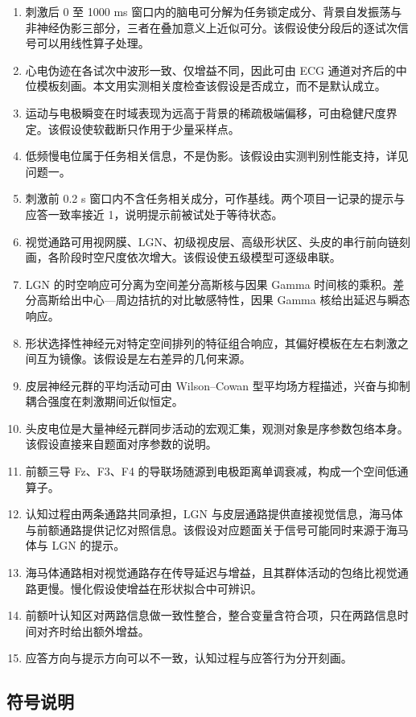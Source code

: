 \documentclass[bwprint]{gmcmthesis}
\begin{document}
\begin{enumerate}
\item 刺激后 0 至 1000 ms 窗口内的脑电可分解为任务锁定成分、背景自发振荡与非神经伪影三部分，三者在叠加意义上近似可分。该假设使分段后的逐试次信号可以用线性算子处理。
\item 心电伪迹在各试次中波形一致、仅增益不同，因此可由 ECG 通道对齐后的中位模板刻画。本文用实测相关度检查该假设是否成立，而不是默认成立。
\item 运动与电极瞬变在时域表现为远高于背景的稀疏极端偏移，可由稳健尺度界定。该假设使软截断只作用于少量采样点。
\item 低频慢电位属于任务相关信息，不是伪影。该假设由实测判别性能支持，详见问题一。
\item 刺激前 0.2 s 窗口内不含任务相关成分，可作基线。两个项目一记录的提示与应答一致率接近 1，说明提示前被试处于等待状态。
\item 视觉通路可用视网膜、LGN、初级视皮层、高级形状区、头皮的串行前向链刻画，各阶段时空尺度依次增大。该假设使五级模型可逐级串联。
\item LGN 的时空响应可分离为空间差分高斯核与因果 Gamma 时间核的乘积。差分高斯给出中心—周边拮抗的对比敏感特性，因果 Gamma 核给出延迟与瞬态响应。
\item 形状选择性神经元对特定空间排列的特征组合响应，其偏好模板在左右刺激之间互为镜像。该假设是左右差异的几何来源。
\item 皮层神经元群的平均活动可由 Wilson--Cowan 型平均场方程描述，兴奋与抑制耦合强度在刺激期间近似恒定。
\item 头皮电位是大量神经元群同步活动的宏观汇集，观测对象是序参数包络本身。该假设直接来自题面对序参数的说明。
\item 前额三导 Fz、F3、F4 的导联场随源到电极距离单调衰减，构成一个空间低通算子。
\item 认知过程由两条通路共同承担，LGN 与皮层通路提供直接视觉信息，海马体与前额通路提供记忆对照信息。该假设对应题面关于信号可能同时来源于海马体与 LGN 的提示。
\item 海马体通路相对视觉通路存在传导延迟与增益，且其群体活动的包络比视觉通路更慢。慢化假设使增益在形状拟合中可辨识。
\item 前额叶认知区对两路信息做一致性整合，整合变量含符合项，只在两路信息时间对齐时给出额外增益。
\item 应答方向与提示方向可以不一致，认知过程与应答行为分开刻画。
\end{enumerate}

\subsection{符号说明}
\end{document}
